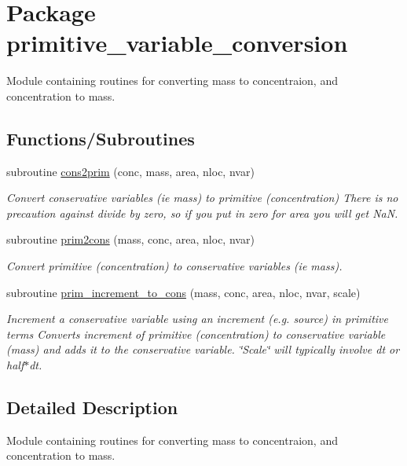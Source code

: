 \hypertarget{a00067}{
\section{Package primitive\_\-variable\_\-conversion}
\label{a00067}
}
Module containing routines for converting mass to concentraion, and concentration to mass.  


\subsection*{Functions/Subroutines}
\begin{CompactItemize}
\item 
subroutine \hyperlink{a00067_2edfec41c794933d2a8f72a39e44154a}{cons2prim} (conc, mass, area, nloc, nvar)
\begin{CompactList}\small\item\em Convert conservative variables (ie mass) to primitive (concentration) There is no precaution against divide by zero, so if you put in zero for area you will get NaN. \item\end{CompactList}\item 
subroutine \hyperlink{a00067_2c2c479bf94ce3408c1dd62d3d6ee8da}{prim2cons} (mass, conc, area, nloc, nvar)
\begin{CompactList}\small\item\em Convert primitive (concentration) to conservative variables (ie mass). \item\end{CompactList}\item 
subroutine \hyperlink{a00067_20339ce5df07783e776535c314dbb515}{prim\_\-increment\_\-to\_\-cons} (mass, conc, area, nloc, nvar, scale)
\begin{CompactList}\small\item\em Increment a conservative variable using an increment (e.g. source) in primitive terms Converts increment of primitive (concentration) to conservative variable (mass) and adds it to the conservative variable. \char`\"{}Scale\char`\"{} will typically involve dt or half$\ast$dt. \item\end{CompactList}\end{CompactItemize}


\subsection{Detailed Description}
Module containing routines for converting mass to concentraion, and concentration to mass. 



